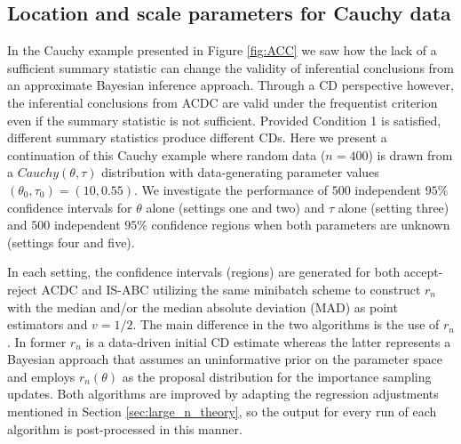 
\subsection{Location and scale parameters for Cauchy data} \label{sec:cauchy}

In the Cauchy example presented in Figure \ref{fig:ACC} we saw how the lack of a sufficient summary statistic can change the validity of inferential conclusions from an approximate Bayesian inference approach. 
Through a CD perspective however, the inferential conclusions from ACDC %
are valid under the frequentist criterion even if the summary statistic is not sufficient. Provided Condition 1 is satisfied, different summary statistics produce different CDs. Here we present a continuation of this Cauchy example where random data ($n=400$) is drawn from a $Cauchy(\theta, \tau)$ distribution with data-generating parameter values $(\theta_0,\tau_0)=(10,0.55)$. We investigate the performance of $500$ independent $95\%$ confidence intervals for $\theta$ alone (settings one and two) and $\tau$ alone (setting three) and $500$ independent $95\%$ confidence regions when both parameters are unknown (settings four and five). 




In each setting, the confidence intervals (regions) are generated for both accept-reject ACDC and IS-ABC utilizing the same 
minibatch scheme to construct $r_n$ with the median and/or the median absolute deviation (MAD) as point estimators and $v=1/2$. The main difference in the two algorithms is the use of $r_n$. In former %
$r_n$ is a data-driven initial CD estimate whereas 
the latter represents a Bayesian approach that assumes an uninformative prior on the parameter space and employs $r_n(\theta)$ as the proposal distribution for the importance sampling updates. Both algorithms are improved by adapting the regression adjustments mentioned in Section \ref{sec:large_n_theory}, so the output for every run of each algorithm is post-processed in this manner. 


